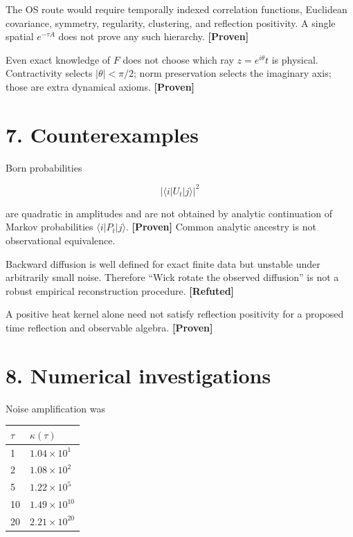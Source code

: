 \documentclass[11pt,a4paper,openany]{report}
\newcommand{\statusProven}{\textcolor{fingreen}{[Proven]}}
\newcommand{\statusRefuted}{\textcolor{finred}{[Refuted]}}
\begin{document}
The OS route would require temporally indexed correlation functions, Euclidean covariance, symmetry, regularity, clustering, and reflection positivity. A single spatial \(e^{-\tau A}\) does not prove any such hierarchy. \textbf{\statusProven{}}

Even exact knowledge of \(F\) does not choose which ray \(z=e^{i\theta}t\) is physical. Contractivity selects \(|\theta|<\pi/2\); norm preservation selects the imaginary axis; those are extra dynamical axioms. \textbf{\statusProven{}}

\section{7. Counterexamples}

Born probabilities

\[
|\langle i|U_t|j\rangle|^2
\]

are quadratic in amplitudes and are not obtained by analytic continuation of Markov probabilities \(\langle i|P_t|j\rangle\). \textbf{\statusProven{}} Common analytic ancestry is not observational equivalence.

Backward diffusion is well defined for exact finite data but unstable under arbitrarily small noise. Therefore “Wick rotate the observed diffusion” is not a robust empirical reconstruction procedure. \textbf{\statusRefuted{}}

A positive heat kernel alone need not satisfy reflection positivity for a proposed time reflection and observable algebra. \textbf{\statusProven{}}

\section{8. Numerical investigations}

Noise amplification was

\begin{center}
\begingroup\small
\setlength{\tabcolsep}{3.5pt}
\renewcommand{\arraystretch}{1.16}
\begin{longtable}{@{}p{}p{}@{}}
\toprule
\textbf{\(\tau\)} & \textbf{\(\kappa(\tau)\)} \\
\midrule
\endhead
1 & \(1.04\times10^1\) \\
2 & \(1.08\times10^2\) \\
5 & \(1.22\times10^5\) \\
10 & \(1.49\times10^{10}\) \\
20 & \(2.21\times10^{20}\) \\
\bottomrule
\end{longtable}
\endgroup
\end{center}
\end{document}

